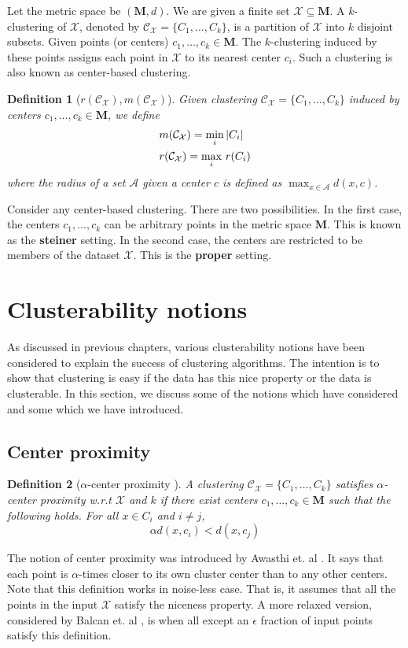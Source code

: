 \documentclass[letterpaper,12pt,titlepage,oneside,final]{book}
\newtheorem{definition}{Definition}
\newcommand{\mc}{\mathcal}
\newcommand{\mb}{\mathbf}
\begin{document}
Let the metric space be $(\mb M, d)$. We are given a finite set $\mc X \subseteq \mb M$. A $k$-clustering of $\mc X$, denoted by $\mc C_{\mc X} = \{C_1, \ldots, C_k\}$, is a partition of $\mc X$ into $k$ disjoint subsets. Given points (or centers) $c_1, \ldots, c_k \in \mb M$. The $k$-clustering induced by these points assigns each point in $\mc X$ to its nearest center $c_i$. Such a clustering is also known as center-based clustering.

\begin{definition}[$r(\mc C_{\mc X}), m(\mc C_{\mc X})$]
Given clustering $\mc C_{\mc X} = \{C_1, \ldots, C_k\}$ induced by centers $c_1, \ldots, c_k \in \mb M$, we define 
\begin{align*}
&m(\mc{C}_{\mc{X}}) = \min_i |C_i|\\
&r(\mc{C}_{\mc{X}}) = \max_i \thinspace r(C_i)
\end{align*}
where the radius of a set $\mc A$ given a center $c$ is defined as $\max_{x \in \mc A} d(x, c)$.
\end{definition}

\noindent Consider any center-based clustering. There are two possibilities. In the first case, the centers $c_1, \ldots, c_k$ can be arbitrary points in the metric space $\mb M$. This is known as the \textbf{steiner} setting. In the second case, the centers are restricted to be members of the dataset $\mc X$. This is the \textbf{proper} setting. 

\section{Clusterability notions}
As discussed in previous chapters, various clusterability notions have been considered to explain the success of clustering algorithms. The intention is to show that clustering is easy if the data has this nice property or the data is clusterable. In this section, we discuss some of the notions which have considered and some which we have introduced.

\subsection{Center proximity}
\begin{definition}[$\alpha$-center proximity \cite{awasthi2012center}]
\label{defn:alphacp}
A clustering $\mc C_{\mc X} = \{C_1, \ldots, C_k\}$ satisfies $\alpha$-center proximity w.r.t $\mc X$ and $k$ if there exist centers $c_1, \ldots, c_k \in \mb M$  such that the following holds. For all $x \in C_i$ and $i\neq j$, $$\alpha d(x, c_i) < d(x, c_j)$$
\end{definition}
The notion of center proximity was introduced by Awasthi et. al \cite{awasthi2012center}. It says that each point is $\alpha$-times closer to its own cluster center than to any other centers. Note that this definition works in noise-less case. That is, it assumes that all the points in the input $\mc X$ satisfy the niceness property. A more relaxed version, considered by Balcan et. al \cite{balcan2012clustering}, is when all except an $\epsilon$ fraction of input points satisfy this definition. 
\end{document}
